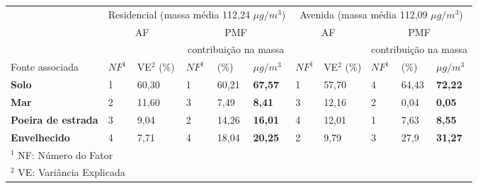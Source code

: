 \begin{tabular}{lll|lll|ll|lll}
\hline
                                                                          & \multicolumn{5}{c|}{Residencial (massa média 112,24 $\mu g / m^3$)} & \multicolumn{5}{c}{Avenida (massa média 112,09 $\mu g / m^3$)}    \\
                                                                          & \multicolumn{2}{c}{AF}      & \multicolumn{3}{c|}{PMF}              & \multicolumn{2}{c}{AF}                    & \multicolumn{3}{c}{PMF}          \\
\hline
 & & &  \multicolumn{3}{c|}{contribuição na massa} & & & \multicolumn{3}{c}{contribuição na massa} \\
Fonte associada                                    & $NF^1$   & VE$^2$ (\%)               & $NF^1$   & (\%)   & $\mu g / m^3$  & $NF^1$       & VE$^2$  (\%)            & $NF^1$ & (\%)  & $\mu g / m^3$ \\
\hline
\textbf{Solo}                                                    & 1  & 60,30               & 1      & 60,21 & \textbf{67,57} & 1  & 57,70               & 4      & 64,43 & \textbf{72,22} \\
\textbf{Mar}                                                     & 2  & 11,60               & 3      & 7,49  & \textbf{8,41} & 3  & 12,16                & 2      & 0,04  & \textbf{0,05}  \\
\textbf{Poeira de estrada}                                       & 3  & 9,04                & 2      & 14,26 & \textbf{16,01} & 4  & 12,01               & 1      & 7,63  & \textbf{8,55}   \\ 
\textbf{Envelhecido}                                             & 4  & 7,71                & 4      & 18,04 & \textbf{20,25} & 2  & 9,79                & 3      & 27,9  & \textbf{31,27}  \\


\hline
\multicolumn{11}{l}{$^1$ NF: Número do Fator} \\
\multicolumn{11}{l}{$^2$ VE: Variância Explicada} \\
\hline
\end{tabular}
